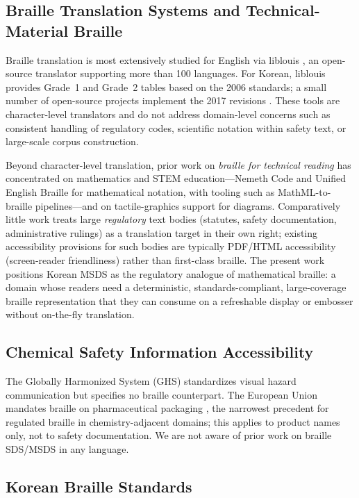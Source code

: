 \documentclass[journal]{IEEEtran}
\begin{document}
\subsection{Braille Translation Systems and Technical-Material Braille}

Braille translation is most extensively studied for English via liblouis \cite{liblouis}, an open-source translator supporting more than 100 languages. For Korean, liblouis provides Grade~1 and Grade~2 tables based on the 2006 standards; a small number of open-source projects implement the 2017 revisions \cite{hangul_braille_converter,hanbraille}. These tools are character-level translators and do not address domain-level concerns such as consistent handling of regulatory codes, scientific notation within safety text, or large-scale corpus construction.

Beyond character-level translation, prior work on \emph{braille for technical reading} has concentrated on mathematics and STEM education---Nemeth Code and Unified English Braille for mathematical notation, with tooling such as MathML-to-braille pipelines---and on tactile-graphics support for diagrams. Comparatively little work treats large \emph{regulatory} text bodies (statutes, safety documentation, administrative rulings) as a translation target in their own right; existing accessibility provisions for such bodies are typically PDF/HTML accessibility (screen-reader friendliness) rather than first-class braille. The present work positions Korean MSDS as the regulatory analogue of mathematical braille: a domain whose readers need a deterministic, standards-compliant, large-coverage braille representation that they can consume on a refreshable display or embosser without on-the-fly translation.

\subsection{Chemical Safety Information Accessibility}

The Globally Harmonized System (GHS) \cite{ghs} standardizes visual hazard communication but specifies no braille counterpart. The European Union mandates braille on pharmaceutical packaging \cite{eu_braille}, the narrowest precedent for regulated braille in chemistry-adjacent domains; this applies to product names only, not to safety documentation. We are not aware of prior work on braille SDS/MSDS in any language.

\subsection{Korean Braille Standards}
\end{document}
